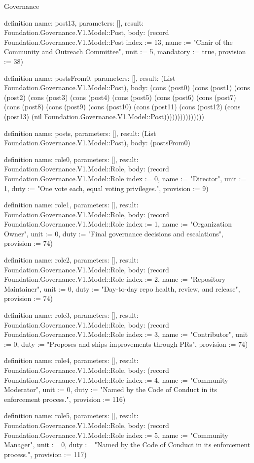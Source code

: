 \begin{lexlean}{Governance}
\begin{semanticmodule}
definition{
  name: post13,
  parameters: [],
  result: Foundation.Governance.V1.Model::Post,
  body: (record Foundation.Governance.V1.Model::Post {index := 13, name := "Chair of the Community and Outreach Committee", unit := 5, mandatory := true, provision := 38})
}

definition{
  name: postsFrom0,
  parameters: [],
  result: (List Foundation.Governance.V1.Model::Post),
  body: (cons (post0) (cons (post1) (cons (post2) (cons (post3) (cons (post4) (cons (post5) (cons (post6) (cons (post7) (cons (post8) (cons (post9) (cons (post10) (cons (post11) (cons (post12) (cons (post13) (nil Foundation.Governance.V1.Model::Post)))))))))))))))
}

definition{
  name: posts,
  parameters: [],
  result: (List Foundation.Governance.V1.Model::Post),
  body: (postsFrom0)
}

definition{
  name: role0,
  parameters: [],
  result: Foundation.Governance.V1.Model::Role,
  body: (record Foundation.Governance.V1.Model::Role {index := 0, name := "Director", unit := 1, duty := "One vote each, equal voting privileges.", provision := 9})
}

definition{
  name: role1,
  parameters: [],
  result: Foundation.Governance.V1.Model::Role,
  body: (record Foundation.Governance.V1.Model::Role {index := 1, name := "Organization Owner", unit := 0, duty := "Final governance decisions and escalations", provision := 74})
}

definition{
  name: role2,
  parameters: [],
  result: Foundation.Governance.V1.Model::Role,
  body: (record Foundation.Governance.V1.Model::Role {index := 2, name := "Repository Maintainer", unit := 0, duty := "Day-to-day repo health, review, and release", provision := 74})
}

definition{
  name: role3,
  parameters: [],
  result: Foundation.Governance.V1.Model::Role,
  body: (record Foundation.Governance.V1.Model::Role {index := 3, name := "Contributor", unit := 0, duty := "Proposes and ships improvements through PRs", provision := 74})
}

definition{
  name: role4,
  parameters: [],
  result: Foundation.Governance.V1.Model::Role,
  body: (record Foundation.Governance.V1.Model::Role {index := 4, name := "Community Moderator", unit := 0, duty := "Named by the Code of Conduct in its enforcement process.", provision := 116})
}

definition{
  name: role5,
  parameters: [],
  result: Foundation.Governance.V1.Model::Role,
  body: (record Foundation.Governance.V1.Model::Role {index := 5, name := "Community Manager", unit := 0, duty := "Named by the Code of Conduct in its enforcement process.", provision := 117})
}


\end{semanticmodule}
\end{lexlean}
